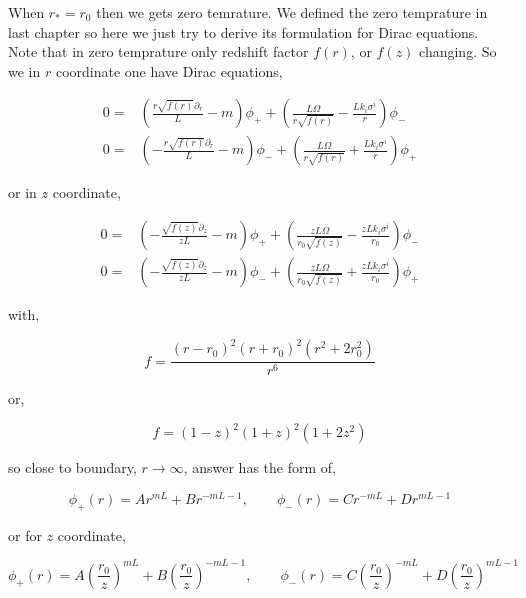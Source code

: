 When $r_* = r_0$ then we gets zero temrature. We defined the zero temprature in last chapter so here we just try to derive its formulation for Dirac equations. Note that in zero temprature only redshift factor $f(r)$, or $f(z)$ changing. So we in $r$ coordinate one have Dirac equations,

\begin{align} 
    0 =& \left( \frac{r\sqrt{f(r)}\partial_r}{L} - m \right) \phi_{+} + \left( \frac{L\Omega}{r\sqrt{f(r)}} - \frac{Lk_i\sigma^i}{r} \right) \phi_{-} \nonumber\\
    0 =& \left(-\frac{r\sqrt{f(r)}\partial_r}{L} - m \right) \phi_{-} + \left( \frac{L\Omega}{r\sqrt{f(r)}} + \frac{Lk_i\sigma^i}{r} \right) \phi_{+}
\end{align}

or in $z$ coordinate,

\begin{align}
    0 =& \left(-\frac{\sqrt{f(z)}\partial_z}{zL} - m \right) \phi_{+} + \left( \frac{zL\Omega}{r_0\sqrt{f(z)}} - \frac{zLk_i\sigma^i}{r_0} \right) \phi_{-} \nonumber\\
    0 =& \left(-\frac{\sqrt{f(z)}\partial_z}{zL} - m \right) \phi_{-} + \left( \frac{zL\Omega}{r_0\sqrt{f(z)}} + \frac{zLk_i\sigma^i}{r_0} \right) \phi_{+}
\end{align}

with,

\begin{equation}
   f = \frac{(r-r_0)^2(r+r_0)^2(r^2+2r_0^2)}{r^6}
\end{equation}

or,

\begin{equation}
   f = (1-z)^2(1+z)^2(1+2z^2)
\end{equation}

so close to boundary, $r\rightarrow \infty$, answer has the form of,

\begin{equation}
   \phi_{+}(r) = Ar^{mL} + Br^{-mL-1}, \qquad \phi_{-}(r) = Cr^{-mL} + Dr^{mL-1}
\end{equation}

or for $z$ coordinate,

\begin{equation}
   \phi_{+}(r) = A\left(\frac{r_0}{z}\right)^{mL} + B\left(\frac{r_0}{z}\right)^{-mL-1}, \qquad \phi_{-}(r) = C\left(\frac{r_0}{z}\right)^{-mL} + D\left(\frac{r_0}{z}\right)^{mL-1}
\end{equation}

